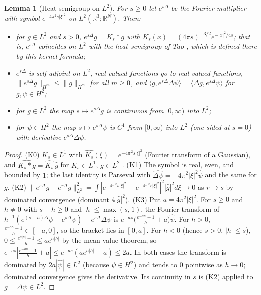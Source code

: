 \documentclass[11pt]{article}
\newtheorem{lemma}[theorem]{Lemma}
\theoremstyle{definition}
\theoremstyle{plain}
\newcommand{\R}{\mathbb R}
\newcommand{\norm}[1]{\lVert #1\rVert}
\begin{document}
\begin{lemma}[Heat semigroup on $L^2$]\label{lem:heat}
For $s\geq0$ let $e^{s\Delta}$ be the Fourier multiplier with symbol
$e^{-4\pi^2s|\xi|^2}$ on $L^2(\R^3;\R^N)$.  Then:
\begin{itemize}
\item[(K0)] for $g\in L^2$ and $s>0$, $e^{s\Delta}g=K_s*g$ with
$K_s(x)=(4\pi s)^{-3/2}e^{-|x|^2/4s}$; that is, $e^{s\Delta}$ coincides on
$L^2$ with the heat semigroup of Tao \cite[\S2, p.~39]{Tao2013}, which is
defined there by this kernel formula;
\item[(K1)] $e^{s\Delta}$ is self-adjoint on $L^2$, real-valued functions
go to real-valued functions, $\norm{e^{s\Delta}g}_{H^m}\leq\norm g_{H^m}$
for all $m\geq0$, and
$\langle g,e^{s\Delta}\Delta\psi\rangle=\langle\Delta g,e^{s\Delta}\psi
\rangle$ for $g,\psi\in H^2$;
\item[(K2)] for $g\in L^2$ the map $s\mapsto e^{s\Delta}g$ is continuous
from $[0,\infty)$ into $L^2$;
\item[(K3)] for $\psi\in H^2$ the map $s\mapsto e^{s\Delta}\psi$ is
$C^1$ from $[0,\infty)$ into $L^2$ (one-sided at $s=0$) with derivative
$e^{s\Delta}\Delta\psi$.
\end{itemize}
\end{lemma}

\begin{proof}
(K0) $K_s\in L^1$ with $\widehat{K_s}(\xi)=e^{-4\pi^2s|\xi|^2}$ (Fourier
transform of a Gaussian), and $\widehat{K_s*g}=\widehat{K_s}\,\widehat g$
for $K_s\in L^1$, $g\in L^2$ \cite[Ch.~I]{SteinWeiss1971}.
(K1) The symbol is real, even, and bounded by $1$; the last identity is
Parseval with $\widehat{\Delta\psi}=-4\pi^2|\xi|^2\widehat\psi$ and the
same for $g$.
(K2) $\norm{e^{s\Delta}g-e^{r\Delta}g}_{L^2}^2=\int|e^{-4\pi^2s|\xi|^2}
-e^{-4\pi^2r|\xi|^2}|^2|\widehat g|^2d\xi\to0$ as $r\to s$ by dominated
convergence (dominant $4|\widehat g|^2$).
(K3) Put $a=4\pi^2|\xi|^2$.  For $s\geq0$ and $h\neq0$ with $s+h\geq0$
and $|h|\leq\max(s,1)$, the Fourier transform of
$h^{-1}(e^{(s+h)\Delta}\psi-e^{s\Delta}\psi)-e^{s\Delta}\Delta\psi$ is
$e^{-as}\big(\frac{e^{-ah}-1}{h}+a\big)\widehat\psi$.  For $h>0$,
$\frac{e^{-ah}-1}{h}\in[-a,0]$, so the bracket lies in $[0,a]$.  For
$h<0$ (hence $s>0$, $|h|\leq s$), $0\leq\frac{e^{a|h|}-1}{|h|}\leq
ae^{a|h|}$ by the mean value theorem, so $e^{-as}|\frac{e^{-ah}-1}{h}+a|
\leq e^{-as}(ae^{a|h|}+a)\leq2a$.  In both cases the transform is
dominated by $2a|\widehat\psi|\in L^2$ (because $\psi\in H^2$) and tends
to $0$ pointwise as $h\to0$; dominated convergence gives the derivative.
Its continuity in $s$ is (K2) applied to $g=\Delta\psi\in L^2$.
\end{proof}
\end{document}
